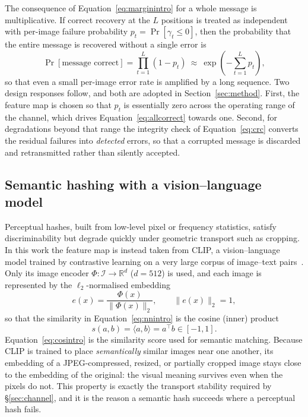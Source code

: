 \documentclass[11pt]{article}
\theoremstyle{definition}
\newcommand{\Eqn}[1]{Equation~\eqref{#1}}
\begin{document}
The consequence of \Eqn{eq:marginintro} for a whole message is multiplicative. If
correct recovery at the $L$ positions is treated as independent with per-image
failure probability $p_t=\Pr[\gamma_t\le 0]$, then the probability that the entire
message is recovered without a single error is
\begin{equation}
  \Pr[\text{message correct}]=\prod_{t=1}^{L}\left(1-p_t\right)
     \ \approx\ \exp\!\left(-\sum_{t=1}^{L} p_t\right),
  \label{eq:allcorrect}
\end{equation}
so that even a small per-image error rate is amplified by a long sequence. Two
design responses follow, and both are adopted in Section~\ref{sec:method}. First,
the feature map is chosen so that $p_t$ is essentially zero across the operating
range of the channel, which drives \Eqn{eq:allcorrect} towards one. Second, for
degradations beyond that range the integrity check of \Eqn{eq:crc} converts the
residual failures into \emph{detected} errors, so that a corrupted message is
discarded and retransmitted rather than silently accepted.

\subsection{Semantic hashing with a vision--language model}\label{sec:clip}
Perceptual hashes, built from low-level pixel or frequency statistics, satisfy
discriminability but degrade quickly under geometric transport such as cropping.
In this work the feature map is instead taken from CLIP, a vision--language model
trained by contrastive learning on a very large corpus of image--text
pairs~\cite{radford2021}. Only its image encoder $\Phi:\mathcal{I}\to\mathbb{R}^d$
($d=512$) is used, and each image is represented by the $\ell_2$-normalised
embedding
\begin{equation}
  e(x)=\frac{\Phi(x)}{\lVert\Phi(x)\rVert_2},\qquad \lVert e(x)\rVert_2=1 ,
  \label{eq:embedintro}
\end{equation}
so that the similarity in \Eqn{eq:nnintro} is the cosine (inner) product
\begin{equation}
  s(a,b)=\langle a,b\rangle = a^{\!\top}b\in[-1,1].
  \label{eq:cosintro}
\end{equation}
Equation~\eqref{eq:cosintro} is the similarity score used for semantic matching.
Because CLIP is trained to place \emph{semantically} similar images near one
another, its embedding of a JPEG-compressed, resized, or partially cropped image
stays close to the embedding of the original: the visual meaning survives even
when the pixels do not. This property is exactly the transport stability required
by \S\ref{sec:channel}, and it is the reason a semantic hash succeeds where a
perceptual hash fails.
\end{document}
